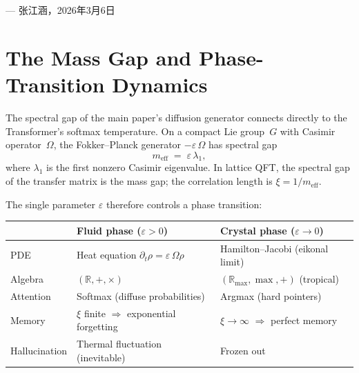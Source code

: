 \documentclass[11pt,a4paper]{article}
\theoremstyle{definition}
\theoremstyle{remark}
\begin{document}
\bigskip

\begin{flushright}
--- 张江涵，2026年3月6日
\end{flushright}


\section{The Mass Gap and Phase-Transition Dynamics}\label{sec:mass-gap}

The spectral gap of the main paper's diffusion generator connects directly
to the Transformer's softmax temperature.
On a compact Lie group~$G$ with Casimir operator~$\Omega$, the
Fokker--Planck generator $-\varepsilon\,\Omega$ has spectral gap
\begin{equation}\label{eq:mass-gap}
  m_{\mathrm{eff}} \;=\; \varepsilon\,\lambda_1,
\end{equation}
where $\lambda_1$ is the first nonzero Casimir eigenvalue.
In lattice QFT, the spectral gap of the transfer matrix is the mass gap;
the correlation length is $\xi = 1/m_{\mathrm{eff}}$.

The single parameter $\varepsilon$ therefore controls a phase transition:

\begin{center}
\small
\begin{tabular}{@{}lll@{}}
\toprule
& \textbf{Fluid phase} ($\varepsilon > 0$) & \textbf{Crystal phase} ($\varepsilon \to 0$) \\
\midrule
PDE & Heat equation $\partial_t\rho = \varepsilon\,\Omega\rho$ & Hamilton--Jacobi (eikonal limit) \\
Algebra & $(\mathbb{R},+,\times)$ & $(\mathbb{R}_{\max},\max,+)$ (tropical) \\
Attention & Softmax (diffuse probabilities) & Argmax (hard pointers) \\
Memory & $\xi$ finite $\Rightarrow$ exponential forgetting & $\xi \to \infty$ $\Rightarrow$ perfect memory \\
Hallucination & Thermal fluctuation (inevitable) & Frozen out \\
\bottomrule
\end{tabular}
\end{center}
\end{document}
